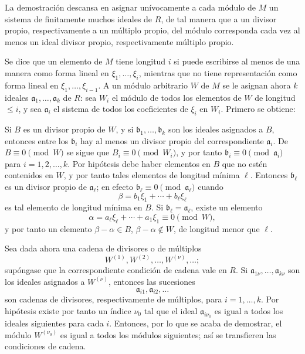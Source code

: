\documentclass[11pt]{article}
\begin{document}
La demostración descansa en asignar unívocamente a cada módulo de $M$ un sistema de finitamente muchos ideales de $R$, de tal manera que a un divisor propio, respectivamente a un múltiplo propio, del módulo corresponda cada vez al menos un ideal divisor propio, respectivamente múltiplo propio.

Se dice que un elemento de $M$ tiene longitud $i$ si puede escribirse al menos de una manera como forma lineal en $\xi_1,\ldots,\xi_i$, mientras que no tiene representación como forma lineal en $\xi_1,\ldots,\xi_{i-1}$. A un módulo arbitrario $W$ de $M$ se le asignan ahora $k$ ideales $\mathfrak a_1,\ldots,\mathfrak a_k$ de $R$: sea $W_i$ el módulo de todos los elementos de $W$ de longitud $\le i$, y sea $\mathfrak a_i$ el sistema de todos los coeficientes de $\xi_i$ en $W_i$. Primero se obtiene:

Si $B$ es un divisor propio de $W$, y si $\mathfrak b_1,\ldots,\mathfrak b_k$ son los ideales asignados a $B$, entonces entre los $\mathfrak b_i$ hay al menos un divisor propio del correspondiente $\mathfrak a_i$. De $B\equiv0\pmod W$ se sigue que $B_i\equiv0\pmod {W_i}$, y por tanto $\mathfrak b_i\equiv0\pmod{\mathfrak a_i}$ para $i=1,2,\ldots,k$. Por hipótesis debe haber elementos en $B$ que no estén contenidos en $W$, y por tanto tales elementos de longitud mínima $\ell$. Entonces $\mathfrak b_\ell$ es un divisor propio de $\mathfrak a_\ell$; en efecto $\mathfrak b_\ell\equiv0\pmod{\mathfrak a_\ell}$ cuando
\[
        \beta=b_1\xi_1+\cdots+b_\ell\xi_\ell
\]
es tal elemento de longitud mínima en $B$. Si $\mathfrak b_\ell=\mathfrak a_\ell$, existe un elemento
\[
        \alpha=a_\ell\xi_\ell+\cdots+a_1\xi_1\equiv0\pmod W,
\]
y por tanto un elemento $\beta-\alpha\in B$, $\beta-\alpha\notin W$, de longitud menor que $\ell$.

Sea dada ahora una cadena de divisores o de múltiplos
\[
        W^{(1)},W^{(2)},\ldots,W^{(\nu)},\ldots;
\]
supóngase que la correspondiente condición de cadena vale en $R$. Si $\mathfrak a_{1\nu},\ldots,\mathfrak a_{k\nu}$ son los ideales asignados a $W^{(\nu)}$, entonces las sucesiones
\[
        \mathfrak a_{i1},\mathfrak a_{i2},\ldots
\]
son cadenas de divisores, respectivamente de múltiplos, para $i=1,\ldots,k$. Por hipótesis existe por tanto un índice $\nu_0$ tal que el ideal $\mathfrak a_{i\nu_0}$ es igual a todos los ideales siguientes para cada $i$. Entonces, por lo que se acaba de demostrar, el módulo $W^{(\nu_0)}$ es igual a todos los módulos siguientes; así se transfieren las condiciones de cadena.
\end{document}
